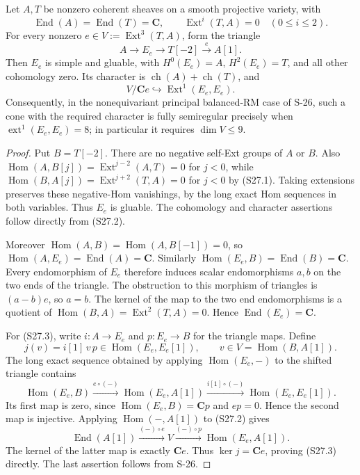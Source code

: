 \begin{proposition}
\label{prop:semireg-two-sheaf-cone}
Let $A,T$ be nonzero coherent sheaves on a smooth projective
variety, with
\[
 \operatorname{End}(A)=\operatorname{End}(T)=\mathbf C,
 \qquad \operatorname{Ext}^i(T,A)=0\quad(0\le i\le2).
 \tag{S27.1}
\]
For every nonzero $e\in V:=\operatorname{Ext}^3(T,A)$,
form the triangle
\[
 A\longrightarrow E_e\longrightarrow T[-2]
       \xrightarrow{e}A[1].
 \tag{S27.2}
\]
Then $E_e$ is simple and gluable, with
$H^0(E_e)=A$, $H^2(E_e)=T$, and all other cohomology zero.
Its character is $\operatorname{ch}(A)+\operatorname{ch}(T)$,
and
\[
 V/\mathbf C e\hookrightarrow
       \operatorname{Ext}^1(E_e,E_e).
 \tag{S27.3}
\]
Consequently, in the nonequivariant principal balanced-RM
case of S-26, such a cone with the required character is
fully semiregular precisely when
$\operatorname{ext}^1(E_e,E_e)=8$; in particular it requires
$\dim V\le9$.
\end{proposition}
\begin{proof}
Put $B=T[-2]$. There are no negative self-Ext groups of
$A$ or $B$. Also
$\operatorname{Hom}(A,B[j])=\operatorname{Ext}^{j-2}(A,T)=0$
for $j<0$, while
$\operatorname{Hom}(B,A[j])=\operatorname{Ext}^{j+2}(T,A)=0$
for $j<0$ by (S27.1). Taking extensions preserves these
negative-Hom vanishings, by the long exact Hom sequences
in both variables. Thus $E_e$ is gluable. The cohomology
and character assertions follow directly from (S27.2).

Moreover $\operatorname{Hom}(A,B)=
\operatorname{Hom}(A,B[-1])=0$, so
$\operatorname{Hom}(A,E_e)=\operatorname{End}(A)=\mathbf C$.
Similarly $\operatorname{Hom}(E_e,B)=\operatorname{End}(B)
=\mathbf C$. Every endomorphism of $E_e$ therefore induces
scalar endomorphisms $a,b$ on the two ends of the triangle.
The obstruction to this morphism of triangles is
$(a-b)e$, so $a=b$. The kernel of the map to the two
end endomorphisms is a quotient of
$\operatorname{Hom}(B,A)=\operatorname{Ext}^2(T,A)=0$.
Hence $\operatorname{End}(E_e)=\mathbf C$.

For (S27.3), write $i:A\to E_e$ and $p:E_e\to B$
for the triangle maps. Define
\[
 j(v)=i[1]\,v\,p\in\operatorname{Hom}(E_e,E_e[1]),
 \qquad v\in V=\operatorname{Hom}(B,A[1]).
\]
The long exact sequence obtained by applying
$\operatorname{Hom}(E_e,-)$ to the shifted triangle
contains
\[
 \operatorname{Hom}(E_e,B)\xrightarrow{e\circ(-)}
 \operatorname{Hom}(E_e,A[1])\xrightarrow{i[1]\circ(-)}
 \operatorname{Hom}(E_e,E_e[1]).
\]
Its first map is zero, since $\operatorname{Hom}(E_e,B)=
\mathbf C p$ and $ep=0$. Hence the second map is injective.
Applying $\operatorname{Hom}(-,A[1])$ to (S27.2) gives
\[
 \operatorname{End}(A[1])\xrightarrow{(-)\circ e}
 V\xrightarrow{(-)\circ p}\operatorname{Hom}(E_e,A[1]).
\]
The kernel of the latter map is exactly $\mathbf C e$.
Thus $\ker j=\mathbf C e$, proving (S27.3) directly.
The last assertion follows from S-26.
\end{proof}

